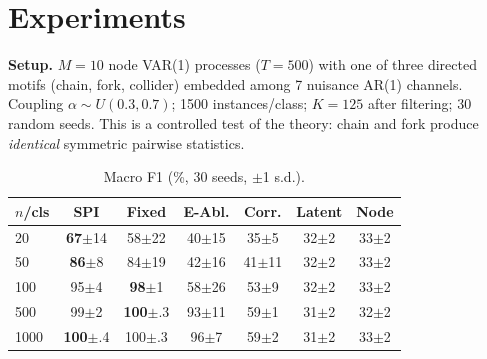 \documentclass{article}
\begin{document}
\section{Experiments}
\label{sec:experiments}

\textbf{Setup.} $M{=}10$ node VAR(1) processes ($T{=}500$) with one of three directed motifs (chain, fork, collider) embedded among 7 nuisance AR(1) channels. Coupling $\alpha \sim U(0.3, 0.7)$; 1500 instances/class; $K{=}125$ after filtering; 30 random seeds. This is a controlled test of the theory: chain and fork produce \emph{identical} symmetric pairwise statistics.

\begin{table}[ht]
\caption{Macro F1 (\%, 30 seeds, $\pm$1 s.d.).}
\label{tab:main}
\vskip 0.05in
\begin{center}
\begin{small}
\begin{tabular}{lcccccc}
\toprule
$n$/cls & SPI & Fixed & E-Abl. & Corr. & Latent & Node \\
\midrule
20   & \textbf{67}{\scriptsize$\pm$14} & 58{\scriptsize$\pm$22} & 40{\scriptsize$\pm$15}  & 35{\scriptsize$\pm$5}  & 32{\scriptsize$\pm$2} & 33{\scriptsize$\pm$2}  \\
50   & \textbf{86}{\scriptsize$\pm$8}  & 84{\scriptsize$\pm$19} & 42{\scriptsize$\pm$16}  & 41{\scriptsize$\pm$11} & 32{\scriptsize$\pm$2} & 33{\scriptsize$\pm$2}  \\
100  & 95{\scriptsize$\pm$4}  & \textbf{98}{\scriptsize$\pm$1}  & 58{\scriptsize$\pm$26}  & 53{\scriptsize$\pm$9}  & 32{\scriptsize$\pm$2} & 33{\scriptsize$\pm$2}  \\
500  & 99{\scriptsize$\pm$2}  & \textbf{100}{\scriptsize$\pm$.3}& 93{\scriptsize$\pm$11}  & 59{\scriptsize$\pm$1}  & 31{\scriptsize$\pm$2} & 32{\scriptsize$\pm$2}  \\
1000 & \textbf{100}{\scriptsize$\pm$.4}& 100{\scriptsize$\pm$.3}& 96{\scriptsize$\pm$7}   & 59{\scriptsize$\pm$2}  & 31{\scriptsize$\pm$2} & 33{\scriptsize$\pm$2}  \\
\bottomrule
\end{tabular}
\end{small}
\end{center}
\vskip -0.15in
\end{table}
\end{document}
